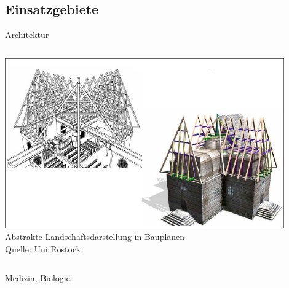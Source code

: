 \subsection{Einsatzgebiete}

\begin{frame}{Architektur}
  \begin{columns}
	\includegraphics[width=0.9\textwidth]{../images/dach.jpg}
	Abstrakte Landschaftsdarstellung in Bauplänen\\
	Quelle: Uni Rostock
  \end{columns}
\end{frame}

\begin{frame}{Medizin, Biologie}
\end{frame}

